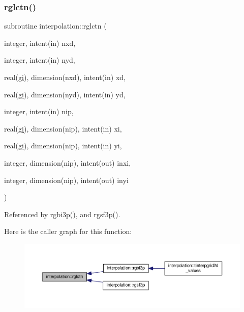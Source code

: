 \subsubsection{\texorpdfstring{rglctn()}{rglctn()}}
{\footnotesize\ttfamily subroutine interpolation\+::rglctn (\begin{DoxyParamCaption}\item[{integer, intent(in)}]{nxd,  }\item[{integer, intent(in)}]{nyd,  }\item[{real(\mbox{\hyperlink{namespaceinterpolation_a7242dea48715e8170bae81efe12c64be}{gi}}), dimension(nxd), intent(in)}]{xd,  }\item[{real(\mbox{\hyperlink{namespaceinterpolation_a7242dea48715e8170bae81efe12c64be}{gi}}), dimension(nyd), intent(in)}]{yd,  }\item[{integer, intent(in)}]{nip,  }\item[{real(\mbox{\hyperlink{namespaceinterpolation_a7242dea48715e8170bae81efe12c64be}{gi}}), dimension(nip), intent(in)}]{xi,  }\item[{real(\mbox{\hyperlink{namespaceinterpolation_a7242dea48715e8170bae81efe12c64be}{gi}}), dimension(nip), intent(in)}]{yi,  }\item[{integer, dimension(nip), intent(out)}]{inxi,  }\item[{integer, dimension(nip), intent(out)}]{inyi }\end{DoxyParamCaption})}



Referenced by rgbi3p(), and rgsf3p().

Here is the caller graph for this function\+:
\nopagebreak
\begin{figure}[H]
\begin{center}
\leavevmode
\includegraphics[width=350pt]{namespaceinterpolation_a2ddceaba83710295f2263bfbe4aa6924_icgraph}
\end{center}
\end{figure}
\mbox{\label{namespaceinterpolation_a20aedcecd7b269f068dfe4fcce012458}} 

